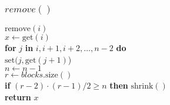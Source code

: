 \documentclass{beamer}
\begin{document}
\begin{frame}
\begin{oframed}
\frametitle{$remove()$}
\begin{flushleft}
\hspace*{1em} \ensuremath{\mathrm{remove}(\ensuremath{\mathit{i}})}\\

\hspace*{1em} \hspace*{1em} \ensuremath{\ensuremath{\mathit{x}} \gets  \ensuremath{\mathrm{get}(\ensuremath{\mathit{i}})}}\\
\hspace*{1em} \hspace*{1em} {\color{black} \textbf{for}} \ensuremath{j} {\color{black} \textbf{in}} \ensuremath{\ensuremath{\mathit{i}},\ensuremath{\mathit{i}}+1,\ensuremath{\mathit{i}}+2,\ldots,\ensuremath{\mathit{n}}-2} {\color{black} \textbf{do}} \\
\hspace*{1em} \hspace*{1em} \hspace*{1em} \ensuremath{\mathrm{set}(\ensuremath{\mathit{j}}, \mathrm{get}(\ensuremath{\mathit{j}}+1)})\\
\hspace*{1em} \hspace*{1em} \ensuremath{\ensuremath{\mathit{n}} \gets  \ensuremath{\ensuremath{\mathit{n}} - 1}}\\
\hspace*{1em} \hspace*{1em} \ensuremath{\ensuremath{\mathit{r}} \gets  \ensuremath{\ensuremath{\mathit{blocks}}.\mathrm{size}()}}\\
\hspace*{1em} \hspace*{1em} {\color{black} \textbf{if}} \ensuremath{(\ensuremath{\mathit{r}}-2)\cdot (\ensuremath{\mathit{r}}-1)/2 \ge n} {\color{black} \textbf{then}}  \ensuremath{\mathrm{shrink}()}\\
\hspace*{1em} \hspace*{1em} {\color{black} \textbf{return}} \ensuremath{\ensuremath{\mathit{x}}}\\
\end{flushleft}
\end{oframed}
\end{frame}
\end{document}
